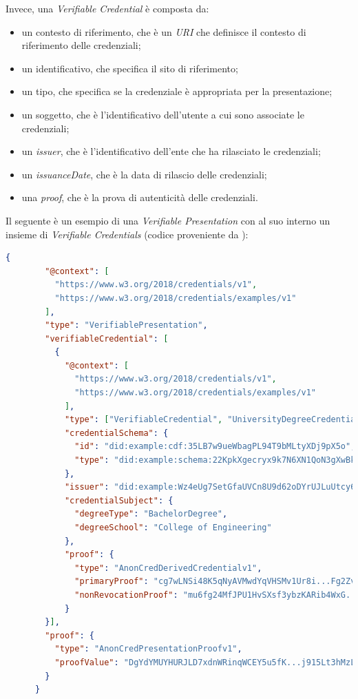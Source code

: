 Invece, una \textit{Verifiable Credential} è composta da:
\begin{itemize}
    \item un contesto di riferimento, che è un \textit{URI} che definisce il contesto di riferimento delle credenziali;
    \item un identificativo, che specifica il sito di riferimento;
    \item un tipo, che specifica se la credenziale è appropriata per la presentazione;
    \item un soggetto, che è l'identificativo dell'utente a cui sono associate le credenziali;
    \item un \textit{issuer}, che è l'identificativo dell'ente che ha rilasciato le credenziali;
    \item un \textit{issuanceDate}, che è la data di rilascio delle credenziali;
    \item una \textit{proof}, che è la prova di autenticità delle credenziali.
\end{itemize}

Il seguente è un esempio di una \textit{Verifiable Presentation} con al suo interno un insieme di \textit{Verifiable Credentials} (codice proveniente da \cite{site:vpw3c}):
\begin{lstlisting}[language=json]
    {
        "@context": [
          "https://www.w3.org/2018/credentials/v1",
          "https://www.w3.org/2018/credentials/examples/v1"
        ],
        "type": "VerifiablePresentation",
        "verifiableCredential": [
          {
            "@context": [
              "https://www.w3.org/2018/credentials/v1",
              "https://www.w3.org/2018/credentials/examples/v1"
            ],
            "type": ["VerifiableCredential", "UniversityDegreeCredential"],
            "credentialSchema": {
              "id": "did:example:cdf:35LB7w9ueWbagPL94T9bMLtyXDj9pX5o",
              "type": "did:example:schema:22KpkXgecryx9k7N6XN1QoN3gXwBkSU8SfyyYQG"
            },
            "issuer": "did:example:Wz4eUg7SetGfaUVCn8U9d62oDYrUJLuUtcy619",
            "credentialSubject": {
              "degreeType": "BachelorDegree",
              "degreeSchool": "College of Engineering"
            },
            "proof": {
              "type": "AnonCredDerivedCredentialv1",
              "primaryProof": "cg7wLNSi48K5qNyAVMwdYqVHSMv1Ur8i...Fg2ZvWF6zGvcSAsym2sgSk737",
              "nonRevocationProof": "mu6fg24MfJPU1HvSXsf3ybzKARib4WxG...RSce53M6UwQCxYshCuS3d2h"
            }
        }],
        "proof": {
          "type": "AnonCredPresentationProofv1",
          "proofValue": "DgYdYMUYHURJLD7xdnWRinqWCEY5u5fK...j915Lt3hMzLHoPiPQ9sSVfRrs1D"
        }
      }
\end{lstlisting}

